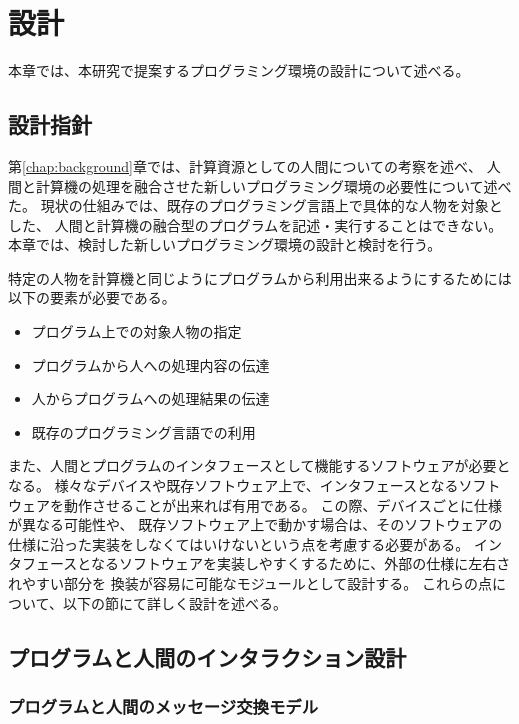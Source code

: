 \chapter{設計}\label{chap:design}

本章では、本研究で提案するプログラミング環境の設計について述べる。

\section{設計指針}\label{ux8a2dux8a08ux6307ux91dd}

第\ref{chap:background}章では、計算資源としての人間についての考察を述べ、
人間と計算機の処理を融合させた新しいプログラミング環境の必要性について述べた。
現状の仕組みでは、既存のプログラミング言語上で具体的な人物を対象とした、
人間と計算機の融合型のプログラムを記述・実行することはできない。
本章では、検討した新しいプログラミング環境の設計と検討を行う。

特定の人物を計算機と同じようにプログラムから利用出来るようにするためには以下の要素が必要である。

\begin{itemize}
\itemsep1pt\parskip0pt
\item
  プログラム上での対象人物の指定
\item
  プログラムから人への処理内容の伝達
\item
  人からプログラムへの処理結果の伝達
\item
  既存のプログラミング言語での利用
\end{itemize}

また、人間とプログラムのインタフェースとして機能するソフトウェアが必要となる。
様々なデバイスや既存ソフトウェア上で、インタフェースとなるソフトウェアを動作させることが出来れば有用である。
この際、デバイスごとに仕様が異なる可能性や、
既存ソフトウェア上で動かす場合は、そのソフトウェアの仕様に沿った実装をしなくてはいけないという点を考慮する必要がある。
インタフェースとなるソフトウェアを実装しやすくするために、外部の仕様に左右されやすい部分を
換装が容易に可能なモジュールとして設計する。
これらの点について、以下の節にて詳しく設計を述べる。

\section{プログラムと人間のインタラクション設計}\label{sec:program-human-interaction-design}

\subsection{プログラムと人間のメッセージ交換モデル}\label{ux30d7ux30edux30b0ux30e9ux30e0ux3068ux4ebaux9593ux306eux30e1ux30c3ux30bbux30fcux30b8ux4ea4ux63dbux30e2ux30c7ux30eb}

